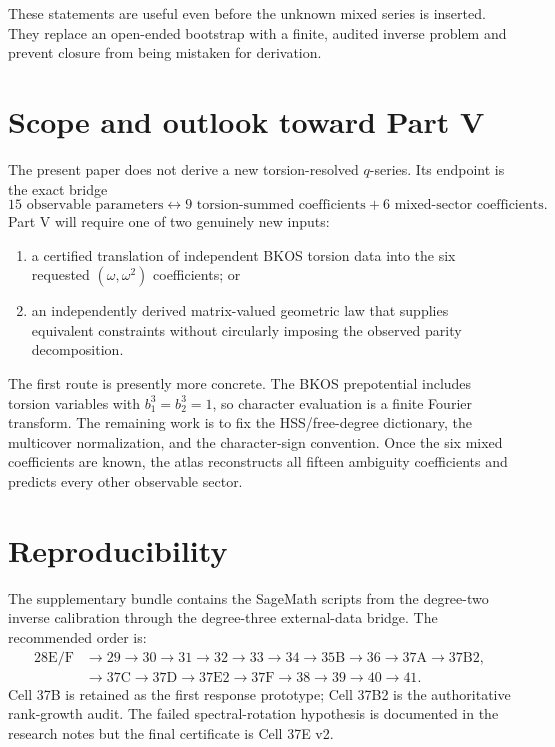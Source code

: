 \documentclass[11pt]{article}
\theoremstyle{definition}
\theoremstyle{remark}
\begin{document}
These statements are useful even before the unknown mixed series is inserted.  They replace an open-ended bootstrap with a finite, audited inverse problem and prevent closure from being mistaken for derivation.

\section{Scope and outlook toward Part V}

The present paper does not derive a new torsion-resolved $q$-series.  Its endpoint is the exact bridge
\[
15\text{ observable parameters}
\longleftrightarrow
9\text{ torsion-summed coefficients}
+6\text{ mixed-sector coefficients}.
\]
Part V will require one of two genuinely new inputs:

\begin{enumerate}[label=(\alph*)]
\item a certified translation of independent BKOS torsion data into the six requested $(\omega,\omega^2)$ coefficients; or
\item an independently derived matrix-valued geometric law that supplies equivalent constraints without circularly imposing the observed parity decomposition.
\end{enumerate}

The first route is presently more concrete.  The BKOS prepotential includes torsion variables with $b_1^3=b_2^3=1$, so character evaluation is a finite Fourier transform.  The remaining work is to fix the HSS/free-degree dictionary, the multicover normalization, and the character-sign convention.  Once the six mixed coefficients are known, the atlas reconstructs all fifteen ambiguity coefficients and predicts every other observable sector.

\section{Reproducibility}

The supplementary bundle contains the SageMath scripts from the degree-two inverse calibration through the degree-three external-data bridge.  The recommended order is:
\[
\begin{aligned}
28\mathrm{E/F}&\to29\to30\to31\to32\to33\to34\to35\mathrm{B}\to36\to37\mathrm{A}\to37\mathrm{B2},\\
&\to37\mathrm{C}\to37\mathrm{D}\to37\mathrm{E2}\to37\mathrm{F}\to38\to39\to40\to41.
\end{aligned}
\]
Cell 37B is retained as the first response prototype; Cell 37B2 is the authoritative rank-growth audit.  The failed spectral-rotation hypothesis is documented in the research notes but the final certificate is Cell 37E v2.
\end{document}
